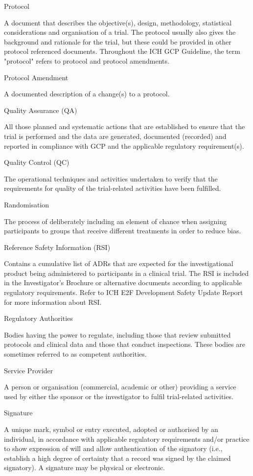 \documentclass[11pt]{article}
\begin{document}
Protocol


A document that describes the objective(s), design, methodology, statistical considerations and organisation of a trial. The protocol usually also gives the background and rationale for the trial, but these could be provided in other protocol referenced documents. Throughout the ICH GCP Guideline, the term "protocol" refers to protocol and protocol amendments.


Protocol Amendment


A documented description of a change(s) to a protocol.


Quality Assurance (QA)


All those planned and systematic actions that are established to ensure that the trial is performed and the data are generated, documented (recorded) and reported in compliance with GCP and the applicable regulatory requirement(s).


Quality Control (QC)


The operational techniques and activities undertaken to verify that the requirements for quality of the trial-related activities have been fulfilled.


Randomisation


The process of deliberately including an element of chance when assigning participants to groups that receive different treatments in order to reduce bias.


Reference Safety Information (RSI)


Contains a cumulative list of ADRs that are expected for the investigational product being administered to participants in a clinical trial. The RSI is included in the Investigator's Brochure or alternative documents according to applicable regulatory requirements. Refer to ICH E2F Development Safety Update Report for more information about RSI.


Regulatory Authorities


Bodies having the power to regulate, including those that review submitted protocols and clinical data and those that conduct inspections. These bodies are sometimes referred to as competent authorities.


Service Provider


A person or organisation (commercial, academic or other) providing a service used by either the sponsor or the investigator to fulfil trial-related activities.


Signature


A unique mark, symbol or entry executed, adopted or authorised by an individual, in accordance with applicable regulatory requirements and/or practice to show expression of will and allow authentication of the signatory (i.e., establish a high degree of certainty that a record was signed by the claimed signatory). A signature may be physical or electronic.
\end{document}
